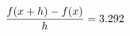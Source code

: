 \documentclass[preview]{standalone}
\begin{document}
\begin{align*}
\special{dvisvgm:raw <g id='unique000'>}\frac{f(x+h)-f(x)}{h} = 3.292\special{dvisvgm:raw </g>}
\end{align*}
\end{document}
